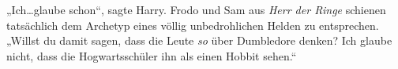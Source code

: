 „Ich…glaube schon“, sagte Harry.
Frodo und Sam aus \emph{Herr der Ringe} schienen tatsächlich dem Archetyp eines völlig unbedrohlichen Helden zu entsprechen.
„Willst du damit sagen, dass die Leute \emph{so} über Dumbledore denken? Ich glaube nicht, dass die Hogwartsschüler ihn als einen Hobbit sehen.“

